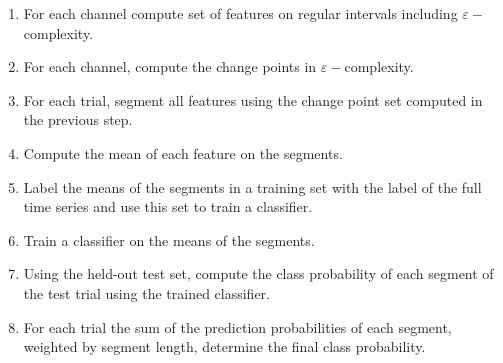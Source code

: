 
\begin{enumerate}
  \item For each channel compute set of features
        on regular intervals including 
        $\varepsilon-$complexity.
  \item For each channel, compute the change points 
        in $\varepsilon-$complexity. 
  \item For each trial, segment all features using the change point 
        set computed in the previous step. 
  \item Compute the mean of each feature on the 
        segments. 
   \item Label the means of the segments 
         in a training 
         set with the label of the full time 
         series and use this set to train 
         a classifier.
   \item Train a classifier on the means of the 
         segments. 
  \item  Using the held-out test set, 
         compute the class probability of each 
       segment of the test trial using the trained 
         classifier. 
  \item  For each trial the sum of the prediction probabilities of each segment, weighted by segment length, determine the final class probability.
\end{enumerate} \label{alg:segment-alg}

